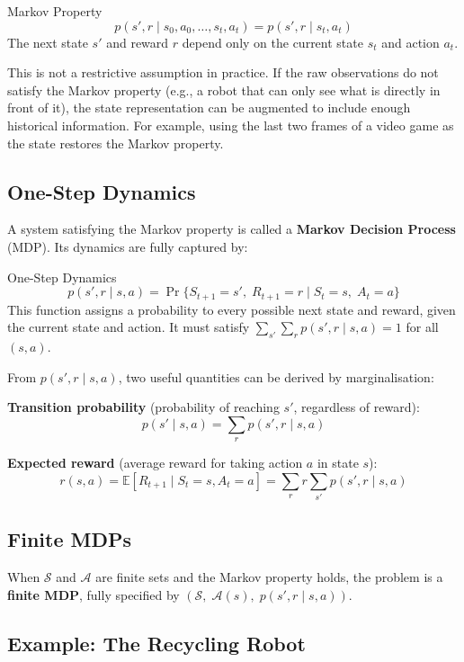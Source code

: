 \documentclass[11pt,a4paper]{article}
\newcommand{\E}{\mathbb{E}}
\newcommand{\term}[1]{\textcolor{DefGreen}{\textbf{#1}}}
\begin{document}
\begin{defbox}{Markov Property}
\[
p(s', r \mid s_0, a_0, \ldots, s_t, a_t) = p(s', r \mid s_t, a_t)
\]
The next state $s'$ and reward $r$ depend only on the current state $s_t$ and action $a_t$.
\end{defbox}

This is not a restrictive assumption in practice. If the raw observations do not satisfy the Markov property (e.g., a robot that can only see what is directly in front of it), the state representation can be augmented to include enough historical information. For example, using the last two frames of a video game as the state restores the Markov property.

\subsection{One-Step Dynamics}

A system satisfying the Markov property is called a \term{Markov Decision Process} (MDP). Its dynamics are fully captured by:

\begin{defbox}{One-Step Dynamics}
\[
p(s', r \mid s, a) = \Pr\{S_{t+1} = s',\; R_{t+1} = r \mid S_t = s,\; A_t = a\}
\]
This function assigns a probability to every possible next state and reward, given the current state and action. It must satisfy $\sum_{s'}\sum_r p(s',r\mid s,a) = 1$ for all $(s,a)$.
\end{defbox}

From $p(s',r\mid s,a)$, two useful quantities can be derived by marginalisation:

\textbf{Transition probability} (probability of reaching $s'$, regardless of reward):
\[
p(s' \mid s, a) = \sum_{r} p(s', r \mid s, a)
\]

\textbf{Expected reward} (average reward for taking action $a$ in state $s$):
\[
r(s, a) = \E[R_{t+1} \mid S_t=s, A_t=a] = \sum_r r \sum_{s'} p(s',r\mid s,a)
\]

\subsection{Finite MDPs}

When $\mathcal{S}$ and $\mathcal{A}$ are finite sets and the Markov property holds, the problem is a \term{finite MDP}, fully specified by $(\mathcal{S},\;\mathcal{A}(s),\;p(s',r\mid s,a))$.

\subsection{Example: The Recycling Robot}
\end{document}
